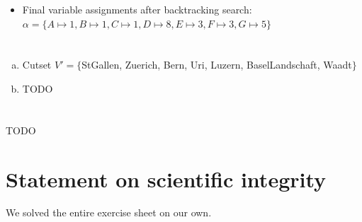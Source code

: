 \documentclass{article} %
\begin{document}
\begin{enumerate}[(a)]
\begin{itemize}
\begin{enumerate}[1.]
            $\rightarrow \text{dom}(F) = \{ 1, 2, 3 \}$
            \item step: revise($G, F$)
            $\rightarrow \text{dom}(G) = \{ 1, 2, 3, 4, 5 \}$
            \item step: revise($G, B$)
            $\rightarrow \text{dom}(G) = \{ 2, 3, 4, 5 \}$
            \item step: revise($C, G$)
            $\rightarrow \text{dom}(C) = \{ 1, 6, 7, 8, 9, 10 \}$
            \item step: revise($C, E$)
            $\rightarrow \text{dom}(C) = \{ 1 \}$
            \item step: revise($A, C$)
            $\rightarrow \text{dom}(A) = \{ 1 \}$
        \end{enumerate}
        \item Final variable assignments after backtracking search:\\[0.5em]
        $\alpha = \{
            A \mapsto 1,
            B \mapsto 1,
            C \mapsto 1,
            D \mapsto 8,
            E \mapsto 3,
            F \mapsto 3,
            G \mapsto 5
        \}$
    \end{itemize}
\end{enumerate}

\newpage
\section{}
\begin{enumerate}[(a)]
    \item Cutset $V' = \{$StGallen, Zuerich, Bern, Uri, Luzern, BaselLandschaft, Waadt$\}$
    \item TODO
\end{enumerate}

\section{}
TODO

\section*{Statement on scientific integrity}
We solved the entire exercise sheet on our own.
\end{document}
